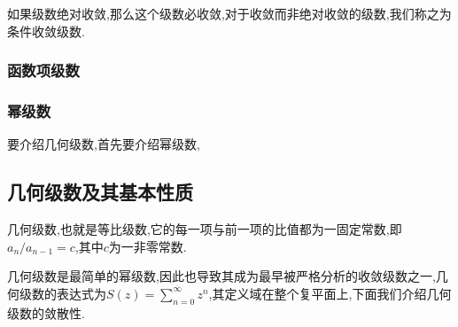 \documentclass[zihao=-4,a4paper]{ctexart}
\begin{document}
如果级数绝对收敛,那么这个级数必收敛,对于收敛而非绝对收敛的级数,我们称之为条件收敛级数.

\subsubsection{函数项级数}

\subsubsection{幂级数}
要介绍几何级数,首先要介绍幂级数,

\subsection{几何级数及其基本性质}

几何级数,也就是等比级数,它的每一项与前一项的比值都为一固定常数,即${a}_{n}/{a}_{n-1}=c$,其中$c$为一非零常数.

几何级数是最简单的幂级数,因此也导致其成为最早被严格分析的收敛级数之一,几何级数的表达式为$S\left(z\right)=\sum^{\infty}_{n=0}{z}^{n}$,其定义域在整个复平面上,下面我们介绍几何级数的敛散性.








\end{document}
